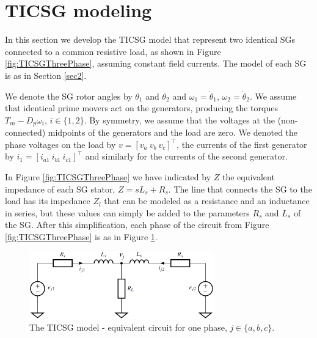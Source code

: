 \documentclass[letterpaper, 10 pt, conference]{ieeeconf}
\renewcommand{\o}    {{\omega}}
\begin{document}
\section{TICSG modeling} \label{sec3} %

In this section we develop the TICSG model that represent two 
identical SGs connected to a common resistive load, as shown in
Figure \ref{fig:TICSGThreePhase}, assuming constant field currents.
The model of each SG is as in Section \ref{sec2}.

We denote the SG rotor angles by $\theta_1$ and $\theta_2$ and
$\o_1=\dot\theta_1$, $\o_2=\dot\theta_2$. We assume that identical
prime movers act on the generators, producing the torques
$T_{m}-D_p\o_i$, $i\in\{1,2\}$. By symmetry, we assume that the
voltages at the (non-connected) midpoints of the generators and the
load are zero. We denoted the phase voltages on the load by
$v=\left[v_a\ v_b\ v_c \right]^\top$, the currents of the first
generator by $i_1=\left[i_{a1} \ i_{b1}\ i_{c1}\right]^\top$ and 
similarly for the currents of the second generator.

In Figure \ref{fig:TICSGThreePhase} we have indicated by $Z$ the
equivalent impedance of each SG stator, $Z=sL_s+R_s$. The line that
connects the SG to the load has its impedance $Z_l$ that can be
modeled as a resistance and an inductance in series, but these values
can simply be added to the parameters $R_s$ and $L_s$ of the SG. After
this simplification, each phase of the circuit from Figure
\ref{fig:TICSGThreePhase} is as in Figure \ref{fig:TICSGOnePhase}.

\begin{figure} %
\centering \includegraphics[width=8cm]{one_phase.eps}
\vspace{-3mm}
\caption{The TICSG model - equivalent circuit for one phase, 
$j\in\{a,b,c\}.$} \vspace{-6mm}
\label{fig:TICSGOnePhase}
\end{figure}
\end{document}
